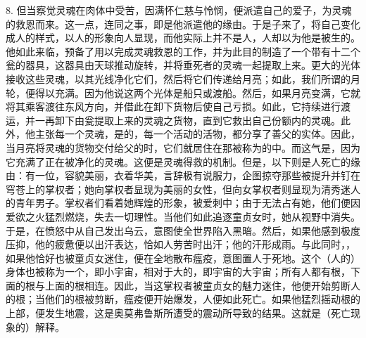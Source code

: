 8. 但当察觉灵魂在肉体中受苦，因满怀仁慈与怜悯，便派遣自己的爱子，为灵魂的救恩而来。这一点，连同之事，即是他派遣他的缘由。于是子来了，将自己变化成人的样式，以人的形象向人显现，而他实际上并不是人，人却以为他是被生的。他如此来临，预备了用以完成灵魂救恩的工作，并为此目的制造了一个带有十二个瓮的器具，这器具由天球推动旋转，并将垂死者的灵魂一起提取上来。更大的光体接收这些灵魂，以其光线净化它们，然后将它们传递给月亮；如此，我们所谓的月轮，便得以充满。因为他说这两个光体是船只或渡船。然后，如果月亮变满，它就将其乘客渡往东风方向，并借此在卸下货物后使自己亏损。如此，它持续进行渡运，并一再卸下由瓮提取上来的灵魂之货物，直到它救出自己份额内的灵魂。此外，他主张每一个灵魂，是的，每一个活动的活物，都分享了善父的实体。因此，当月亮将灵魂的货物交付给父的时，它们就居住在那被称为的中。而这气是，因为它充满了正在被净化的灵魂。这便是灵魂得救的机制。但是，以下则是人死亡的缘由：有一位，容貌美丽，衣着华美，言辞极有说服力，企图掠夺那些被提升并钉在穹苍上的掌权者；她向掌权者显现为美丽的女性，但向女掌权者则显现为清秀迷人的青年男子。掌权者们看着她辉煌的形象，被爱刺中；由于无法占有她，他们便因爱欲之火猛烈燃烧，失去一切理性。当他们如此追逐童贞女时，她从视野中消失。于是，在愤怒中从自己发出乌云，意图使全世界陷入黑暗。然后，如果他感到极度压抑，他的疲惫便以出汗表达，恰如人劳苦时出汗；他的汗形成雨。与此同时，，如果他恰好也被童贞女迷住，便在全地散布瘟疫，意图置人于死地。这个（人的）身体也被称为一个，即小宇宙，相对于大的，即宇宙的大宇宙；所有人都有根，下面的根与上面的根相连。因此，当这掌权者被童贞女的魅力迷住，他便开始剪断人的根；当他们的根被剪断，瘟疫便开始爆发，人便如此死亡。如果他猛烈摇动根的上部，便发生地震，这是奥莫弗鲁斯所遭受的震动所导致的结果。这就是（死亡现象的）解释。\par

